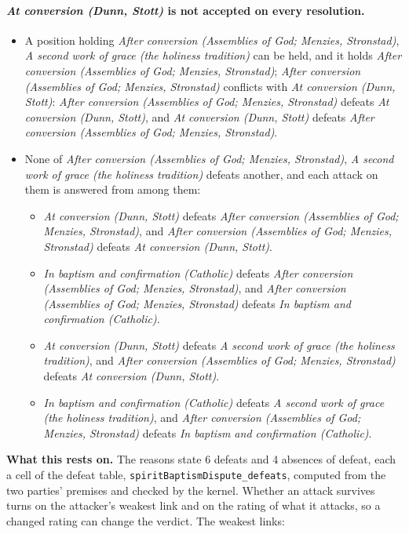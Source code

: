 \documentclass[11pt]{article}
\begin{document}
\paragraph{\emph{At conversion (Dunn, Stott)} is not accepted on every resolution.}
\begin{itemize}
\item A position holding \emph{After conversion (Assemblies of God; Menzies, Stronstad)}, \emph{A second work of grace (the holiness tradition)} can be held, and it holds \emph{After conversion (Assemblies of God; Menzies, Stronstad)}; \emph{After conversion (Assemblies of God; Menzies, Stronstad)} conflicts with \emph{At conversion (Dunn, Stott)}: \emph{After conversion (Assemblies of God; Menzies, Stronstad)} defeats \emph{At conversion (Dunn, Stott)}, and \emph{At conversion (Dunn, Stott)} defeats \emph{After conversion (Assemblies of God; Menzies, Stronstad)}.
\item None of \emph{After conversion (Assemblies of God; Menzies, Stronstad)}, \emph{A second work of grace (the holiness tradition)} defeats another, and each attack on them is answered from among them:
\begin{itemize}
\item \emph{At conversion (Dunn, Stott)} defeats \emph{After conversion (Assemblies of God; Menzies, Stronstad)}, and \emph{After conversion (Assemblies of God; Menzies, Stronstad)} defeats \emph{At conversion (Dunn, Stott)}.
\item \emph{In baptism and confirmation (Catholic)} defeats \emph{After conversion (Assemblies of God; Menzies, Stronstad)}, and \emph{After conversion (Assemblies of God; Menzies, Stronstad)} defeats \emph{In baptism and confirmation (Catholic)}.
\item \emph{At conversion (Dunn, Stott)} defeats \emph{A second work of grace (the holiness tradition)}, and \emph{After conversion (Assemblies of God; Menzies, Stronstad)} defeats \emph{At conversion (Dunn, Stott)}.
\item \emph{In baptism and confirmation (Catholic)} defeats \emph{A second work of grace (the holiness tradition)}, and \emph{After conversion (Assemblies of God; Menzies, Stronstad)} defeats \emph{In baptism and confirmation (Catholic)}.
\end{itemize}
\end{itemize}
\par\noindent\textbf{What this rests on.} The reasons state 6 defeats and 4 absences of defeat, each a cell of the defeat table, \texttt{spirit\allowbreak{}Baptism\allowbreak{}Dispute\_\allowbreak{}defeats}, computed from the two parties' premises and checked by the kernel. Whether an attack survives turns on the attacker's weakest link and on the rating of what it attacks, so a changed rating can change the verdict. The weakest links:
\end{document}

